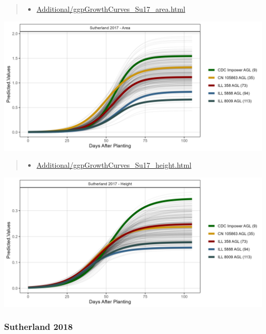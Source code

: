 \documentclass[
]{article}
\providecommand{\tightlist}{%
  \setlength{\itemsep}{0pt}\setlength{\parskip}{0pt}}
\begin{document}
\begin{quote}
\begin{itemize}
\tightlist
\item
  \href{https://derekmichaelwright.github.io/AGILE_LDP_UAV/Additional/ggpGrowthCurves_Su17_area.html}{Additional/ggpGrowthCurves\_Su17\_area.html}
\end{itemize}
\end{quote}

\includegraphics{Additional/ggGrowthCurves_Su17_area.png}

\begin{quote}
\begin{itemize}
\tightlist
\item
  \href{https://derekmichaelwright.github.io/AGILE_LDP_UAV/Additional/ggpGrowthCurves_Su17_height.html}{Additional/ggpGrowthCurves\_Su17\_height.html}
\end{itemize}
\end{quote}

\includegraphics{Additional/ggGrowthCurves_Su17_height.png}

\subsubsection{Sutherland 2018}\label{sutherland-2018}
\end{document}
